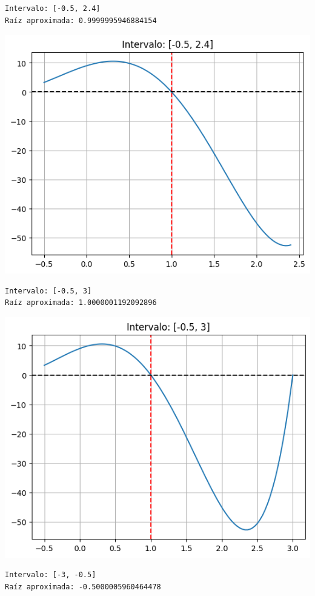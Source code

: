 \documentclass[
  letterpaper,
  DIV=11,
  numbers=noendperiod]{scrartcl}
\begin{document}
\begin{verbatim}
Intervalo: [-0.5, 2.4]
Raíz aproximada: 0.9999995946884154
\end{verbatim}

\includegraphics{Deber3_files/figure-pdf/cell-6-output-4.png}

\begin{verbatim}
Intervalo: [-0.5, 3]
Raíz aproximada: 1.0000001192092896
\end{verbatim}

\includegraphics{Deber3_files/figure-pdf/cell-6-output-6.png}

\begin{verbatim}
Intervalo: [-3, -0.5]
Raíz aproximada: -0.5000005960464478
\end{verbatim}
\end{document}
